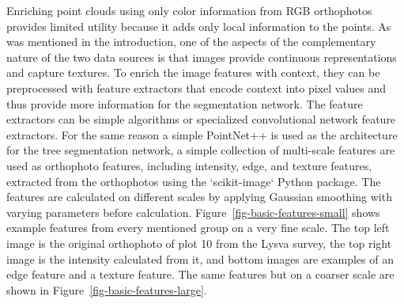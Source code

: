 Enriching point clouds using only color information from RGB orthophotos provides limited utility because it adds only local information to the points.
As was mentioned in the introduction, one of the aspects of the complementary nature of the two data sources is that images provide continuous representations and capture textures.
To enrich the image features with context, they can be preprocessed with feature extractors that encode context into pixel values and thus provide more information for the segmentation network.
The feature extractors can be simple algorithms or specialized convolutional network feature extractors.
For the same reason a simple PointNet++ is used as the architecture for the tree segmentation network, a simple collection of multi-scale features are used as orthophoto features, including intensity, edge, and texture features, extracted from the orthophotos using the `scikit-image` Python package.
The features are calculated on different scales by applying Gaussian smoothing with varying parameters before calculation.
Figure~\ref{fig-basic-features-small} shows example features from every mentioned group on a very fine scale.
The top left image is the original orthophoto of plot 10 from the Lysva survey, the top right image is the intensity calculated from it, and bottom images are examples of an edge feature and a texture feature.
The same features but on a coarser scale are shown in Figure~\ref{fig-basic-features-large}.

